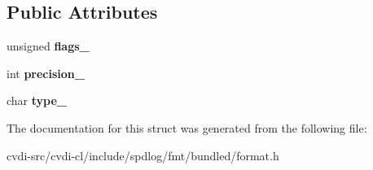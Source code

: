 \subsection*{Public Attributes}
\begin{DoxyCompactItemize}
\item 
unsigned {\bfseries flags\+\_\+}\hypertarget{structfmt_1_1FormatSpec_a9fbd00ed2b8e3b96eaa2beb54aff641e}{}\label{structfmt_1_1FormatSpec_a9fbd00ed2b8e3b96eaa2beb54aff641e}

\item 
int {\bfseries precision\+\_\+}\hypertarget{structfmt_1_1FormatSpec_a8444724bdd0a55bf3226a17e321c12c5}{}\label{structfmt_1_1FormatSpec_a8444724bdd0a55bf3226a17e321c12c5}

\item 
char {\bfseries type\+\_\+}\hypertarget{structfmt_1_1FormatSpec_aa6f085ef583f708dde9636c03adea6ab}{}\label{structfmt_1_1FormatSpec_aa6f085ef583f708dde9636c03adea6ab}

\end{DoxyCompactItemize}


The documentation for this struct was generated from the following file\+:\begin{DoxyCompactItemize}
\item 
cvdi-\/src/cvdi-\/cl/include/spdlog/fmt/bundled/format.\+h\end{DoxyCompactItemize}
